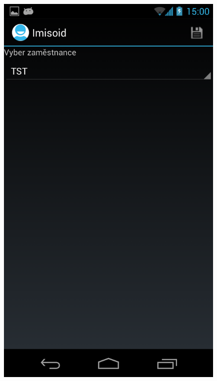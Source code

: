 \documentclass{diplomka}
\begin{document}
\vspace{-3 mm}
\begin{figure}[H]
\centering
\begin{minipage}{.45\textwidth}
  \centering
  \includegraphics[width=.9\linewidth]{scr/widgetact.png}
  \label{fig:widgetact}
\end{minipage}\hfill%
\begin{minipage}{.45\textwidth}
  \centering

\end{minipage}
\end{figure}
\end{document}
